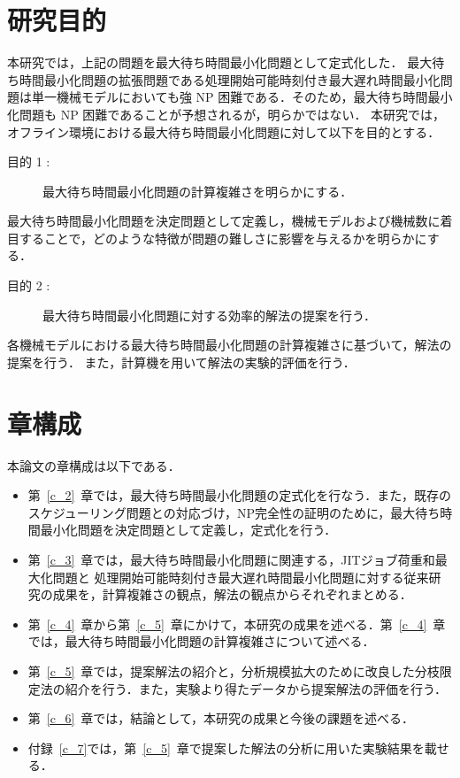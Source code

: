 \documentclass[12pt]{optlab-bachelor}
\begin{document}
\section{研究目的}
本研究では，上記の問題を最大待ち時間最小化問題として定式化した．
最大待ち時間最小化問題の拡張問題である処理開始可能時刻付き最大遅れ時間最小化問題は単一機械モデルにおいても強 NP  困難である．そのため，最大待ち時間最小化問題も NP 困難であることが予想されるが，明らかではない．
本研究では，オフライン環境における最大待ち時間最小化問題に対して以下を目的とする．
\begin{description}
  \item[目的 1 :]
  最大待ち時間最小化問題の計算複雑さを明らかにする．
\end{description}

最大待ち時間最小化問題を決定問題として定義し，機械モデルおよび機械数に着目することで，どのような特徴が問題の難しさに影響を与えるかを明らかにする．

\begin{description}
  \item[目的 2 :]
  最大待ち時間最小化問題に対する効率的解法の提案を行う．
\end{description}

各機械モデルにおける最大待ち時間最小化問題の計算複雑さに基づいて，解法の提案を行う．
また，計算機を用いて解法の実験的評価を行う．

\section{章構成}
本論文の章構成は以下である．
\begin{itemize}
  \item 第~\ref{c_2}~章では，最大待ち時間最小化問題の定式化を行なう．また，既存のスケジューリング問題との対応づけ，NP完全性の証明のために，最大待ち時間最小化問題を決定問題として定義し，定式化を行う．
  \item 第~\ref{c_3}~章では，最大待ち時間最小化問題に関連する，JITジョブ荷重和最大化問題と
  処理開始可能時刻付き最大遅れ時間最小化問題に対する従来研究の成果を，計算複雑さの観点，解法の観点からそれぞれまとめる．
  \item 第~\ref{c_4}~章から第~\ref{c_5}~章にかけて，本研究の成果を述べる．第~\ref{c_4}~章では，最大待ち時間最小化問題の計算複雑さについて述べる．
  \item 第~\ref{c_5}~章では，提案解法の紹介と，分析規模拡大のために改良した分枝限定法の紹介を行う．また，実験より得たデータから提案解法の評価を行う．
  \item 第~\ref{c_6}~章では，結論として，本研究の成果と今後の課題を述べる．
  \item 付録~\ref{c_7}では，第~\ref{c_5}~章で提案した解法の分析に用いた実験結果を載せる．
\end{itemize}
\end{document}
